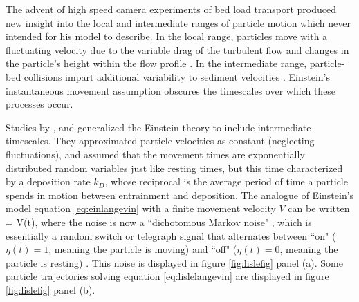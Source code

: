 The advent of high speed camera experiments of bed load transport produced new insight into the local and intermediate ranges of particle motion \citep{Abbott1977,Francis1973,Drake1988} which \citet{Einstein1937} never intended for his model to describe.
In the local range, particles move with a fluctuating velocity due to the variable drag of the turbulent flow \citep{Lajeunesse2010,Fathel2015} and changes in the particle's height within the flow profile \citep{VanRijn1984,Wiberg1985}.
In the intermediate range, particle-bed collisions impart additional variability to sediment velocities \citep{Gordon1972,Martin2013}.
Einstein's instantaneous movement assumption obscures the timescales over which these processes occur.

Studies by \citet{Lisle1998}, and \citet{Lajeunesse2017} generalized the Einstein theory to include intermediate timescales. They approximated particle velocities as constant (neglecting fluctuations), and assumed that the movement times are exponentially distributed random variables just like resting times, but this time characterized by a deposition rate $k_D$, whose reciprocal is the average period of time a particle spends in motion between entrainment and deposition.
The analogue of Einstein's model equation \ref{eq:einlangevin} with a finite movement velocity $V$ can be written
\be {} = V\eta(t), \label{eq:lislelangevin}\ee
where the noise is now a ``dichotomous Markov noise" \citep{VanDenBroeck1990,Bena2006}, which is essentially a random switch or telegraph signal that alternates between ``on" ($\eta(t) = 1$, meaning the particle is moving) and ``off" ($\eta(t) = 0$, meaning the particle is resting) \citep{Cox1965,Horsthemke1984, Masoliver1991, Masoliver1996}. This noise is displayed in figure \ref{fig:lislefig} panel (a). Some particle trajectories solving equation \ref{eq:lislelangevin} are displayed in figure \ref{fig:lislefig} panel (b).

